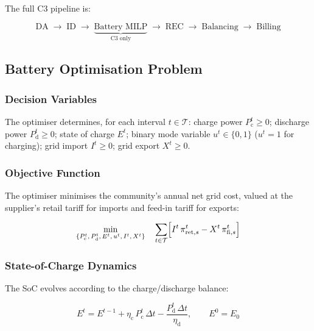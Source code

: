 \documentclass[12pt,a4paper]{article}
\begin{document}
The full C3 pipeline is:

\begin{equation}
\text{DA}
\;\rightarrow\; \text{ID}
\;\rightarrow\; \underbrace{\text{Battery MILP}}_{\text{C3 only}}
\;\rightarrow\; \text{REC}
\;\rightarrow\; \text{Balancing}
\;\rightarrow\; \text{Billing}
\label{eq:c3_pipeline}
\end{equation}

\subsection{Battery Optimisation Problem}
\label{subsec:battery_milp}

\subsubsection{Decision Variables}

The optimiser determines, for each interval $t \in \mathcal{T}$:
charge power $P_{\mathrm{c}}^{t} \geq 0$; discharge power
$P_{\mathrm{d}}^{t} \geq 0$; state of charge $E^{t}$; binary mode
variable $u^{t} \in \{0,1\}$ ($u^{t} = 1$ for charging); grid import
$I^{t} \geq 0$; grid export $X^{t} \geq 0$.

\subsubsection{Objective Function}

The optimiser minimises the community's annual net grid cost, valued at the
supplier's retail tariff for imports and feed-in tariff for exports:

\begin{equation}
\min_{\{P_{\mathrm{c}}^{t},\,P_{\mathrm{d}}^{t},\,E^{t},\,u^{t},\,I^{t},\,X^{t}\}}
\quad
\sum_{t \in \mathcal{T}}
\Bigl[
  I^{t}\,\pi_{\mathrm{ret},s}^{t}
 -X^{t}\,\pi_{\mathrm{fi},s}^{t}
\Bigr]
\label{eq:battery_obj_c3}
\end{equation}

\subsubsection{State-of-Charge Dynamics}

The SoC evolves according to the charge/discharge balance:

\begin{equation}
E^{t} = E^{t-1} + \eta_{\mathrm{c}}\,P_{\mathrm{c}}^{t}\,\Delta t
              - \frac{P_{\mathrm{d}}^{t}\,\Delta t}{\eta_{\mathrm{d}}},
\qquad E^{0} = E_{0}
\label{eq:soc_dynamics_c3}
\end{equation}
\end{document}

